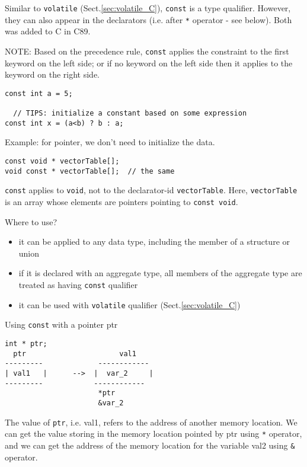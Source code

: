 Similar to \verb!volatile! (Sect.\ref{sec:volatile_C}), \verb!const! is a type
qualifier. However, they can also appear in the declarators (i.e. after
\verb!*! operator - see below). Both was added to C in C89.

NOTE: Based on the precedence rule, \verb!const! applies the constraint to the
first keyword on the left side; or if no keyword on the left side then it
applies to the keyword on the right side.

\begin{verbatim}
const int a = 5;
 
  // TIPS: initialize a constant based on some expression
const int x = (a<b) ? b : a;
\end{verbatim}

Example: for pointer, we don't need to initialize the data.
\begin{verbatim}
const void * vectorTable[];
void const * vectorTable[];  // the same
\end{verbatim}
\verb!const! applies to \verb!void!, not to the declarator-id
\verb!vectorTable!. Here, \verb!vectorTable! is an array whose elements are
pointers pointing to \verb!const void!. 


Where to use?
\begin{itemize}
  \item it can be applied to any data type, including the member of a structure
  or union
  \item if it is declared with an aggregate type, all members of the aggregate
  type are treated as having \verb!const! qualifier
  \item it can be used with \verb!volatile! qualifier (Sect.\ref{sec:volatile_C})
\end{itemize}

Using \verb!const! with a pointer ptr
\begin{verbatim}
int * ptr;
  ptr                      val1
---------             ------------
| val1   |      -->  |  var_2     |
---------            ------------
                      *ptr
                      &var_2
\end{verbatim}
The value of \verb!ptr!, i.e. val1, refers to the address of another memory
location. We can get the value storing in the memory location pointed by ptr
using \verb!*! operator, and we can get the address of the memory location for
the variable val2 using \verb!&! operator.


